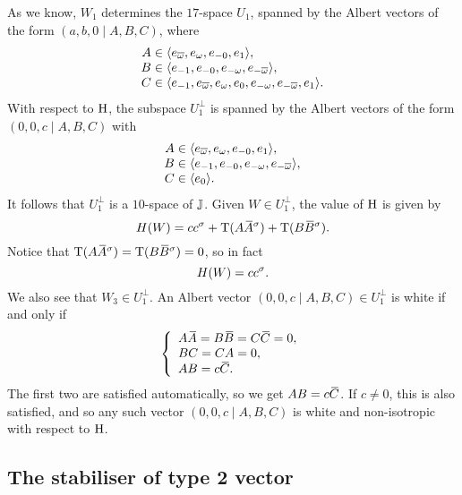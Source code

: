 As we know, $W_1$ determines the $17$-space $U_1$, spanned by the Albert vectors of the form
$(a,b,0\mid A,B,C)$, where
\begin{equation}
	\begin{array}{r@{\;}c@{\;}l}
		A & \in & \langle e_{\bar{\omega}}, e_{\omega}, e_{-0}, e_1 \rangle, \\
		B & \in & \langle e_{-1}, e_{-0}, e_{-\omega}, e_{-\bar{\omega}} \rangle, \\
		C & \in & \langle e_{-1}, e_{\bar{\omega}}, e_{\omega}, e_0,
						e_{-\omega}, e_{-\bar{\omega}}, e_1 \rangle.
	\end{array}
\end{equation}
With respect to $\mathrm{H}$, the subspace $U_1^{\perp}$ is spanned by the Albert vectors
of the form \mbox{$(0,0,c \mid A, B, C)$} with
\begin{equation}
	\begin{array}{r@{\;}c@{\;}l}
		A & \in & \langle e_{\bar{\omega}}, e_{\omega}, e_{-0}, e_1 \rangle, \\
		B & \in & \langle e_{-1}, e_{-0}, e_{-\omega}, e_{-\bar{\omega}} \rangle, \\
		C & \in & \langle e_0 \rangle.
	\end{array}
\end{equation}
It follows that $U_1^{\perp}$ is a $10$-space of $\mathbb{J}$. Given $W \in U_1^{\perp}$, the value 
of $\mathrm{H}$ is given by
\begin{equation}
	H(W) = c c^{\s} + \Tr(A \ovA^{\s}) + \Tr(B \ovB^{\s} ).
\end{equation}
Notice that $\Tr(A \ovA^{\s}) = \Tr(B \ovB^{\s}) = 0$, so in fact
\begin{equation}
	H(W) = c c^{\sigma}.
\end{equation}
We also see that $W_3 \in U_1^{\perp}$. An Albert vector $(0,0,c\mid A,B,C) \in U_1^{\perp}$ 
is white if and only if 
\begin{equation}
	\left\{
		\begin{array}{l}
			A\ovA = B\ovB = C\ovC = 0, \\
			BC = CA = 0, \\
			AB = c \ovC. 
		\end{array}
	\right.
\end{equation}
The first two are satisfied automatically, so we get $AB = c \mathord{\mbox{\hspace*{0pt}}\,\overline{\!C\!\!\;}\!\:}\mbox{\hspace*{0pt}}$. If $c \neq 0$, this is 
also satisfied, and so any such vector $(0,0,c\mid A,B,C)$ is white and non-isotropic with respect
to $\mathrm{H}$. 

\subsection{The stabiliser of type 2 vector}

